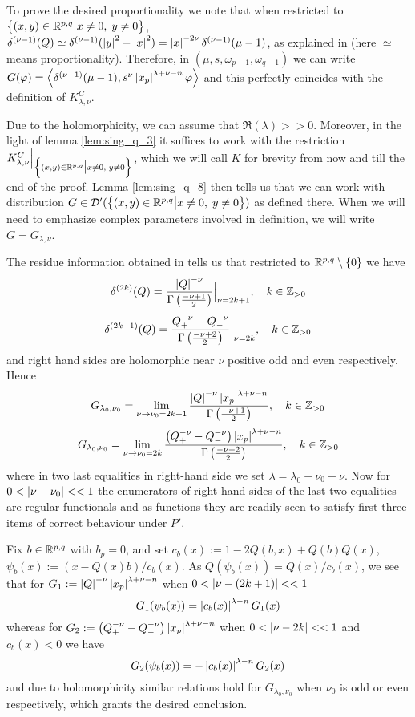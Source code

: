 \documentclass[10pt]{article} %
\newcommand{\D}{\mathcal{D}}
\theoremstyle{definition}
\theoremstyle{remark}
\begin{document}
\begin{myproof}
	To prove the desired proportionality we note that when restricted to $\left\{(x,y)\in\mathbb{R}^{p,q}\big| x\neq0,\;y\neq0\right\}$, $\delta^{(\nu-1)}(Q)\simeq
	\delta^{(\nu-1)}(\left|y\right|^2-\left|x\right|^2)=\left|x\right|^{-2\nu}\delta^{(\nu-1)}(\mu-1)$, as explained in
	\cite[ch. III, sec 1.7]{gelfand1980distribution} (here $\simeq$ means proportionality). Therefore, in 
	$(\mu,s,\omega_{p-1},\omega_{q-1}
	)$ we can write $G(\varphi)=\left<\delta^{(\nu-1)}(\mu-1),s^{\nu}\left|x_p\right|^{\lambda+\nu-n}\varphi\right>$ and this
	perfectly coincides with the definition of $K_{\lambda,\nu}^C$.
\end{myproof}
\begin{myproof}
	Due to the holomorphicity, we can assume that $\Re(\lambda)>>0$.
	Moreover, in the light of lemma \ref{lem:sing_q_3} it suffices to work with the restriction $K^C_{\lambda,\nu}\Big|_{\left\{(x,y)\in\mathbb{R}^{p,q}\big| x\neq0,\;y\neq0\right\}}$,
	which we will call $K$ for brevity from now and till the end of the proof. Lemma \ref{lem:sing_q_8} then tells
	us that we can work with distribution $G\in\D'(\Upp)$ as defined there. When we will need to emphasize complex parameters
	involved in definition, we will write $G=G_{\lambda,\nu}$.

	The residue information obtained in \cite[ch. III, sec 2.2]{gelfand1980distribution} tells us that restricted to 
	$\mathbb{R}^{p,q}\setminus\left\{ 0 \right\}$ we have
	\[\delta^{(2k)}(Q)=\frac{\left|Q\right|^{-\nu}}{\Gamma\left( \frac{-\nu+1}{2} \right)}\Big|_{\nu=2k+1},\quad k\in\mathbb{Z}_{>0}\]
	\[\delta^{(2k-1)}(Q)=\frac{Q_+^{-\nu}-Q_-^{-\nu}}{\Gamma\left( \frac{-\nu+2}{2} \right)}\Big|_{\nu=2k},\quad k\in\mathbb{Z}_{>0}\]
	and right hand sides are holomorphic near $\nu$ positive odd and even respectively. Hence
	\[G_{\lambda_0,\nu_0}=\lim_{\nu\to\nu_0=2k+1}\frac{\myabs{Q}^{-\nu}\myabs{x_p}^{\lambda+\nu-n}}
		{\Gamma\left( \frac{-\nu+1}{2} \right)},\quad k\in\Z_{>0}\]
	\[G_{\lambda_0,\nu_0}=\lim_{\nu\to\nu_0=2k}\frac{\mybra{Q_+^{-\nu}-Q_-^{-\nu}}\myabs{x_p}^{\lambda+\nu-n}}
		{\Gamma\left( \frac{-\nu+2}{2} \right)},\quad k\in\Z_{>0}\]
	where in two last equalities in right-hand side we set $\lambda=\lambda_0+\nu_0-\nu$.
	Now for $0<\left|\nu-\nu_0\right|<<1$ the enumerators of right-hand sides of the last two equalities are regular functionals
	and as functions they are readily seen to satisfy first three items of correct behaviour under $P'$.

	Fix $b\in\mathbb{R}^{p,q}$ with $b_p=0$, and set $c_b(x):=1-2Q(b,x)+Q(b)Q(x)$, $\psi_b(x):=(x-Q(x)b)/c_b(x)$.
	As $Q(\psi_b(x))=Q(x)/c_b(x)$,
	we see that for $G_1:={\left|Q\right|^{-\nu}\left|x_p\right|^{\lambda+\nu-n}}$ when $0<\left|\nu-(2k+1)\right|<<1$
	\[G_1(\psi_b(x))=\left|c_b(x)\right|^{\lambda-n}G_1(x)\]
	whereas for $G_2:={\left(Q_+^{-\nu}-Q_-^{-\nu}\right)\left|x_p\right|^{\lambda+\nu-n}}$ when $0<\left|\nu-2k\right|<<1$
	and $c_b(x)<0$ we have
	\[G_2(\psi_b(x))=-\left|c_b(x)\right|^{\lambda-n}G_2(x)\]
	and due to holomorphicity similar relations hold for $G_{\lambda_0,\nu_0}$ when $\nu_0$ is odd or even respectively,
	which grants the desired conclusion.
\end{myproof}
\end{document}
